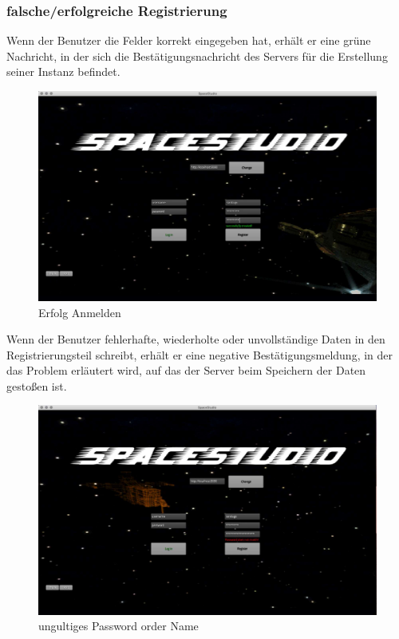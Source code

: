 \documentclass[12pt]{article}
\begin{document}
\subsubsection{falsche/erfolgreiche  Registrierung}
Wenn der Benutzer die Felder korrekt eingegeben hat, erhält er eine grüne Nachricht, in der sich die Bestätigungsnachricht des Servers für die Erstellung seiner Instanz befindet.\\
\begin{figure}[h]
\centering
\includegraphics[scale=0.4]{TestProtocolBilder/erfolgAnmelden.jpg}
\caption{Erfolg Anmelden}
\end{figure}

Wenn der Benutzer fehlerhafte, wiederholte oder unvollständige Daten in den Registrierungsteil schreibt, erhält er eine negative Bestätigungsmeldung, in der das Problem erläutert wird, auf das der Server beim Speichern der Daten gestoßen ist.\\
\begin{figure}[h]
\centering
\includegraphics[scale=0.4]{TestProtocolBilder/doesnotMatchPassword.jpg}
\caption{ungultiges Password order Name}
\end{figure}
\newpage
\end{document}
